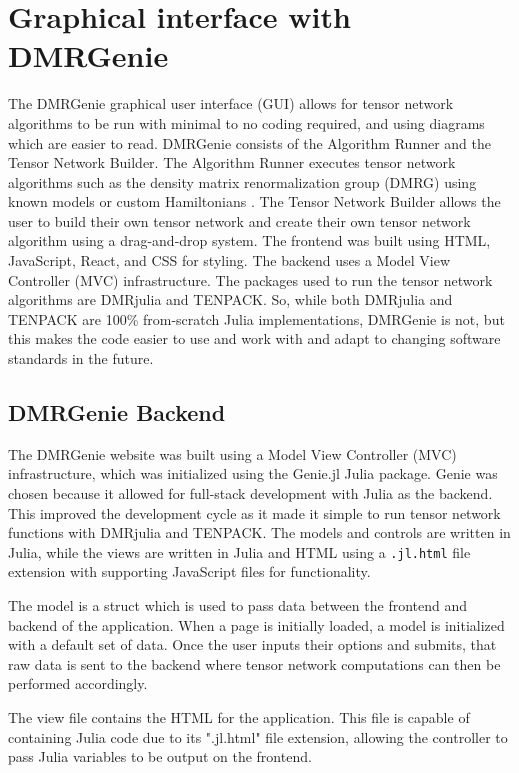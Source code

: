 \documentclass{juliacon}
\providecommand{\DIFaddend}{} %
\begin{document}
\DIFaddend \section{Graphical interface with DMRGenie}
The DMRGenie graphical user interface (GUI) allows for tensor network algorithms to be run with minimal to no coding required, and using diagrams which are easier to read. DMRGenie consists of the Algorithm Runner and the Tensor Network Builder. The Algorithm Runner executes tensor network algorithms such as the density matrix renormalization group (DMRG) using known models or custom Hamiltonians \cite{dmrjulia1}. The Tensor Network Builder allows the user to build their own tensor network and create their own tensor network algorithm using a drag-and-drop system. The frontend was built using HTML, JavaScript, React, and CSS for styling. The backend uses a Model View Controller (MVC) infrastructure. The packages used to run the tensor network algorithms are DMRjulia and TENPACK. So, while both DMRjulia and TENPACK are 100\% from-scratch Julia implementations, DMRGenie is not, but this makes the code easier to use and work with and adapt to changing software standards in the future.

\subsection{DMRGenie Backend}\label{backend}
The DMRGenie website was built using a Model View Controller (MVC) infrastructure, which was initialized using the Genie.jl Julia package. Genie was chosen because it allowed for full-stack development with Julia as the backend. This improved the development cycle as it made it simple to run tensor network functions with DMRjulia and TENPACK. The models and controls are written in Julia, while the views are written in Julia and HTML using a \texttt{.jl.html} file extension with supporting JavaScript files for functionality. 

The model is a struct which is used to pass data between the frontend and backend of the application. 
When a page is initially loaded, a model is initialized with a default set of data. Once the user inputs their options and submits, that raw data is sent to the backend where tensor network computations can then be performed accordingly.

The view file contains the HTML for the application. This file is capable of containing Julia code due to its ".jl.html" file extension, allowing the controller to pass Julia variables to be output on the frontend. 
\end{document}
